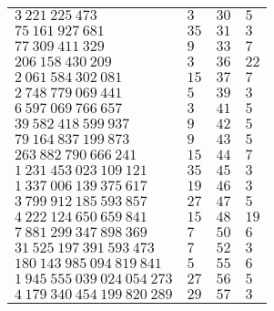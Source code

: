 \begin{tabular}{llll}
    \(3~221~225~473\)              & \(3\)   & \(30\) & \(5\)  \\
    \(75~161~927~681\)             & \(35\)  & \(31\) & \(3\)  \\
    \(77~309~411~329\)             & \(9\)   & \(33\) & \(7\)  \\
    \(206~158~430~209\)            & \(3\)   & \(36\) & \(22\) \\
    \(2~061~584~302~081\)          & \(15\)  & \(37\) & \(7\)  \\
    \(2~748~779~069~441\)          & \(5\)   & \(39\) & \(3\)  \\
    \(6~597~069~766~657\)          & \(3\)   & \(41\) & \(5\)  \\
    \(39~582~418~599~937\)         & \(9\)   & \(42\) & \(5\)  \\
    \(79~164~837~199~873\)         & \(9\)   & \(43\) & \(5\)  \\
    \(263~882~790~666~241\)        & \(15\)  & \(44\) & \(7\)  \\
    \(1~231~453~023~109~121\)      & \(35\)  & \(45\) & \(3\)  \\
    \(1~337~006~139~375~617\)      & \(19\)  & \(46\) & \(3\)  \\
    \(3~799~912~185~593~857\)      & \(27\)  & \(47\) & \(5\)  \\
    \(4~222~124~650~659~841\)      & \(15\)  & \(48\) & \(19\) \\
    \(7~881~299~347~898~369\)      & \(7\)   & \(50\) & \(6\)  \\
    \(31~525~197~391~593~473\)     & \(7\)   & \(52\) & \(3\)  \\
    \(180~143~985~094~819~841\)    & \(5\)   & \(55\) & \(6\)  \\
    \(1~945~555~039~024~054~273\)  & \(27\)  & \(56\) & \(5\)  \\
    \(4~179~340~454~199~820~289\)  & \(29\)  & \(57\) & \(3\)  \\
    \hline
\end{tabular}
